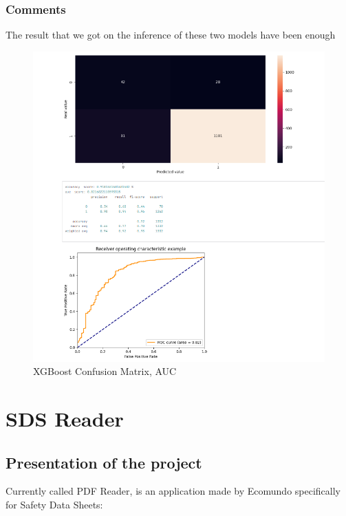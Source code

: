 \documentclass[a4paper,12pt,twoside]{report}
\begin{document}
\subsubsection{Comments}
The result that we got on the inference of these two models have been enough

\begin{figure}[H]
		\includegraphics[width=\textwidth]{images/xgboost}
	\caption[XGBoost Confusion Matrix, AUC]{XGBoost Confusion Matrix, AUC}
\label{xgboost}
\end{figure}
\section{SDS Reader}

\subsection{Presentation of the project}
Currently called PDF Reader, is an application made by Ecomundo specifically for Safety Data Sheets:
\end{document}
